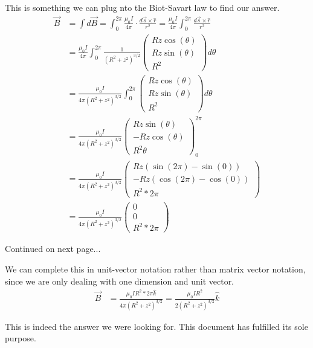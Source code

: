 \documentclass[12pt]{article}
\begin{document}
    This is something we can plug nto the Biot-Savart law to find our answer.
    \begin{align}
        \vec{B} &=  \int d\vec{B}
            =   \int_{0}^{2\pi} \frac{\mu_0 I}{4\pi} \cdot \frac{d\vec{s} \times \hat{r}}{r^2}
            =   \frac{\mu_0 I}{4\pi} \int_{0}^{2\pi} \frac{d\vec{s} \times \hat{r}}{r^2}\\
            &=  \frac{\mu_0 I}{4\pi} \int_{0}^{2\pi} \frac{1}{\left(R^2 + z^2\right)^{3/2}} \begin{pmatrix}
                Rz\cos(\theta)\\
                Rz\sin(\theta)\\
                R^2
            \end{pmatrix} d\theta\\
            &=   \frac{\mu_0 I}{4\pi\left(R^2 + z^2\right)^{3/2}} \int_{0}^{2\pi} \begin{pmatrix}
                Rz\cos(\theta)\\
                Rz\sin(\theta)\\
                R^2
            \end{pmatrix} d\theta\\
            &=  \frac{\mu_0 I}{4\pi\left(R^2 + z^2\right)^{3/2}} \begin{pmatrix}
                Rz\sin(\theta)\\
                -Rz\cos(\theta)\\
                R^2\theta
            \end{pmatrix}_{0}^{2\pi}\\
            &=  \frac{\mu_0 I}{4\pi\left(R^2 + z^2\right)^{3/2}} \begin{pmatrix}
                Rz(\sin(2\pi) - \sin(0))\\
                -Rz(\cos(2\pi) - \cos(0))\\
                R^2*2\pi
            \end{pmatrix}\\
            &=  \frac{\mu_0 I}{4\pi\left(R^2 + z^2\right)^{3/2}} \begin{pmatrix}
                0\\
                0\\
                R^2*2\pi
            \end{pmatrix}
    \end{align}

    \null\hfill Continued on next page...

    \pagebreak
    We can complete this in unit-vector notation rather than matrix vector notation, since we are only dealing with one dimension and unit vector.
    \begin{align}
        \vec{B} &=  \frac{\mu_0 I R^2*2\pi \hat{k}}{4\pi\left(R^2 + z^2\right)^{3/2}}
            =   \frac{\mu_0 I R^2}{2\left(R^2 + z^2\right)^{3/2}} \hat{k}
    \end{align}

    This is indeed the answer we were looking for. This document has fulfilled its sole purpose.
\end{document}
